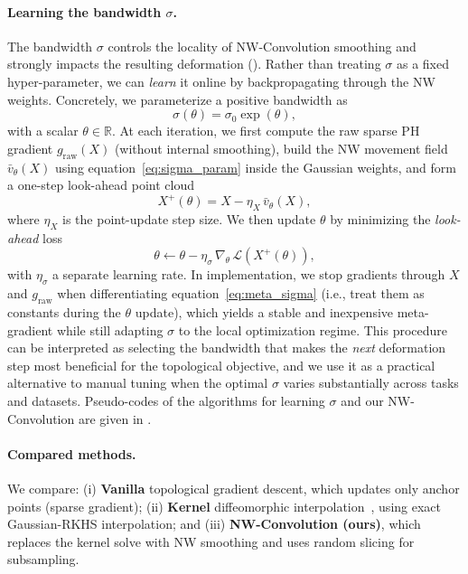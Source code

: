 \documentclass{article} %
\def\eqref#1{equation~\ref{#1}}
\newcommand{\R}{\mathbb{R}}
\theoremstyle{plain}
\theoremstyle{definition}
\theoremstyle{remark}
\begin{document}
\paragraph{Learning the bandwidth $\sigma$.}
The bandwidth $\sigma$ controls the locality of NW-Convolution smoothing and strongly impacts the resulting deformation
(). Rather than treating $\sigma$ as a fixed hyper-parameter, we can \emph{learn} it online by
backpropagating through the NW weights.
Concretely, we parameterize a positive bandwidth as
\begin{equation}
\label{eq:sigma_param}
\sigma(\theta) = \sigma_0 \exp(\theta),
\end{equation}
with a scalar $\theta\in\R$.
At each iteration, we first compute the raw sparse PH gradient $g_{\mathrm{raw}}(X)$ (without internal smoothing), build
the NW movement field $\bar v_\theta(X)$ using \eqref{eq:sigma_param} inside the Gaussian weights, and form a one-step
look-ahead point cloud
\begin{equation}
\label{eq:lookahead}
X^{+}(\theta) = X - \eta_X \,\bar v_\theta(X),
\end{equation}
where $\eta_X$ is the point-update step size.
We then update $\theta$ by minimizing the \emph{look-ahead} loss
\begin{equation}
\label{eq:meta_sigma}
\theta \leftarrow \theta - \eta_\sigma \,\nabla_\theta \,\mathcal{L}\!\left(X^{+}(\theta)\right),
\end{equation}
with $\eta_\sigma$ a separate learning rate.
In implementation, we stop gradients through $X$ and $g_{\mathrm{raw}}$ when differentiating \eqref{eq:meta_sigma} (i.e.,
treat them as constants during the $\theta$ update), which yields a stable and inexpensive meta-gradient while still
adapting $\sigma$ to the local optimization regime.
This procedure can be interpreted as selecting the bandwidth that makes the \emph{next} deformation step most beneficial
for the topological objective, and we use it as a practical alternative to manual tuning when the optimal $\sigma$ varies substantially across tasks and datasets. Pseudo-codes of the algorithms for learning $\sigma$ and our NW-Convolution are given in .




\paragraph{Compared methods.}
We compare:
(i) \textbf{Vanilla} topological gradient descent, which updates only anchor points (sparse gradient); (ii) \textbf{Kernel} diffeomorphic interpolation~\cite{carriere2024diffeomorphic}, using exact Gaussian-RKHS interpolation; and (iii) \textbf{NW-Convolution (ours)}, which replaces the kernel solve with NW smoothing and uses random slicing for subsampling.
\end{document}

